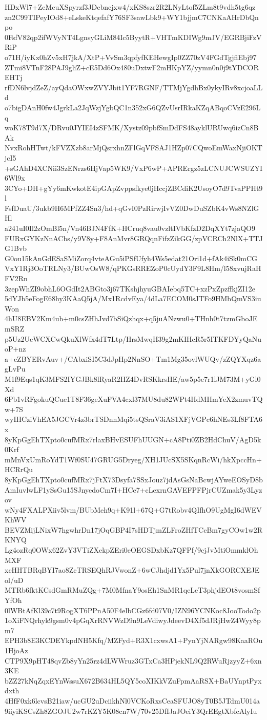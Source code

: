 HDxWl7+ZeMcuXSpyrzf3JDcbncjxw4/xKS8szr2R2LNyLtof5ZLm8t9vdh5tg6qz
zn2C99TIPeyIOd8+eLskeKtqefafY76SF3sawLbk9+WY1bjjmC7CNKaAHrDbQnpo
0FsfV82qp2ifWVyNT4LgnsyGLiM84Ic5ByytR+VHTmKDIWg9mJV/EGRBjiFzVRiP
o71H/iyKx0hZv5xH7jkA/XtP+VvSm3qpfyfKEHewgIp0ZZ70zV4FGdTgjfiEbj97
ZTmi8VTnF28PAJ9gliZ+cE5Dd6Ox480uDxtwF2mHKpYZ/yymn0n0j9tYDCOREHTj
rfDN6lvjdZeZ/ayQdaOWxwZVYJbit1YF7RGNF/TTMjYgdhBx0ykyIRv8xcjoaLLd
o7bigDAnH0fw4JgrkLa2JqWzjYgbQC1n352xG6QZvUsrIRkaKZqABqoCVzE296Lq
woK78T9d7X/DRvu0JYIEI4zSFMK/Xystz09pbfSmDdFS48ayklURUwq6izCn8BAk
NvxRohHTwt/kFVZXzb8arMjQsrxhnZFlGqVFSAJ1HZp07CQwoEmWaxNjiOKTjcI5
+sGAhD4XCNii3SzENrzs6HjVap5WK9/VxP6wP+APRErgz5zLCNUJCWSUZYI6Wl9x
3CYo+DH+gYy6mKwkotE4ipGApZvppsfkye0jHccjZBCdiK2UsoyO7d9TvaPPHt9l
FsfDuaU/3ukb9H6MPfZZ4Sn3/hd+qGvI0PzRirwjIvVZ0DwDuSZbK4vWs8NZlGHl
a241uI0Il2zOmBl5n/Vn46BJN4FfK+HCruq8vau0vzltIVbKfzD2DqXYt7zjaQO9
FURxGYKzNnACbs/y9V8y+F8AnMvr8GRQqnFifzZikGG/zpVCRCh2NlX+TTJG1Bvb
G0ou15kAnGdESaSMiZorq4vteAGu5iPSfUfyh4Ws5edat21Ori1d+fAk4iSk0mCG
VxY1Rj3OoTRLNy3/BUwOsW8/qPKGsRREZoP0cUydY3F9L8Hm/l58xvujRaHFV2Rn
3zepWhZI9obhL6OGdIt2ABGto3j67TKshjhyuGBAIebq5TC+xzPxZpzffkjZI12e
5dYJb5eFogE68hy3KAaQ5jA/Mx1RcdvEya/4dLa7ECOM0sJTFo9HMbQmVS3iuWon
4hU8EBV2Km4ub+m0csZHhJvd7bSiQzhqx+q5juANzwu0+THnh0t7tzmGboJEmSRZ
p5Uz2UcWCXCwQkuXlWfx4dT7Ltp/HrsMwqH39g2mKIHcR5r5ITKFDYyQaNuoP+nz
a+cZBYERvAuv+/CAbxiSI5C3dJpHp2NnSO+Tm1Mg35ovlWUQv/zZQYXqz6agLvPu
M1f9Eqs1qK3MFS2IYGJBk8lRyaR2HZ4DvRSKkrsHE/aw5p5e7r1lJM73M+yGl0Xd
6Pb1vRFgokuQCue1T8F36geXuFVA4cxl37MU8du82WPt4HdMHmYeX2zmuvTQw+7S
wyIHCziVhEA5JGCVr4z3brTSDnnMqi5tsQSraV3iAS1XFjVGPc6hNEs3Lf8FTA6x
8yKpGgEhTXpto0cufMRx7rlaxBHvESUFhUUGN+cA8Pti0ZB2HdChuV/AgD5k0Krf
mMnVxUmRoYdT1Wf0SU47GRUG5Dryeg/XH1JUcSX5SKqnRcWi/hkXpccHn+HCRrQu
8yKpGgEhTXpto0cufMRx7jFtX73Dsyfa7SSxJouz7jdAsGsNaBcwjAYweEOSyD8b
AmIuvlwLF1ySsGu15SJnyedoCm7I+HCe7+cLexrnGAVEFPFPjrCUZmak5y3Lyzov
wNy4FXALPXiiv5lvm/BUbMeh9q+K91l+67Q+G7tRobv4QIfhO9UgMgI6dWEVKhWV
BEVZMijLNixW7hgwhrDn17jOqGBP4I7sHDTjmZLFroZHfTCcBm7gyCOw1w2RKNYQ
Lg4ozRq0OWx62ZvY3VTiZXekpZEri0eOEGSDxbKz7QFPf/9cjJvMtiOmmklOhMXF
xcHHTBRqBYI7ao8ZcTRSEQhRJVwonZ+6wCJhdjd1Yx5Pul7jnXkGORCXEJEol/uD
MTRb6fktKCsdGmRMuZQg+7M0MfnaY9osEh1SnMR1qeLeT3phjdEOt8vosmSfYfOh
0lWBtAfKl39c7t9RogXT6PPnA50F4elbCGz6fd07V0/IZN96YCNKoc8JooTodo2p
1oXiFNQrhyk9gsm0v4pGqXrRNVWzD9n9LeVdiwyJdeevD4Xf5dJRjHwZ4Wyy8pm7
EPH3b8E3KCDEYkpdNH5Kfq/MZFyd+R3X1cxwsA1+PynYjNARgw98KaaROu1HjoAz
CTP9X9pHT48qvZb8yYn25rz4dLWWruz3GTxCa3HPjekNL9Q2RWuRjzyyZ+6xn3KE
bZZ27kNqZqxEYnWssuX672B634HL5QY5coXIKkVZuFpmAaRSX+BaUYnptPyxdxth
4HfF0xk6lcvsB21iaw/ucGU2uDciikhNl0VCKoRxsCeaSFUJO8yT0B5JTdmU014a
9iiyiKSCsZh8ZGOJU2w7rKZY5K08cn7W/70v25DfIJaJOeiY3QrEEgtXbfcAlyIu

